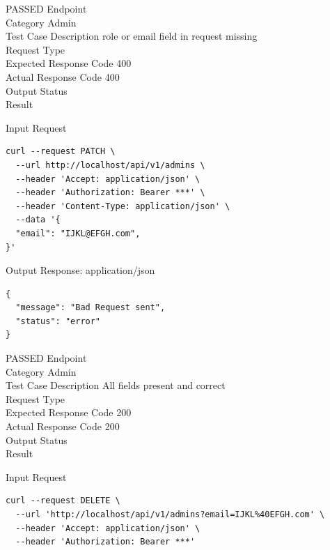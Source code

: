 \begin{testcase}{38}{PASSED}
Endpoint \hfill {}\\
Category \hfill Admin\\
Test Case Description \hfill role or email field in request missing\\

Request Type    \hfill {}\\
Expected Response Code    \hfill 400\\
Actual Response Code    \hfill 400\\

Output Status \hfill {}\\
Result \hfill {}

\begin{ipblock}{Input Request}
\begin{verbatim}
curl --request PATCH \
  --url http://localhost/api/v1/admins \
  --header 'Accept: application/json' \
  --header 'Authorization: Bearer ***' \
  --header 'Content-Type: application/json' \
  --data '{
  "email": "IJKL@EFGH.com",
}'
\end{verbatim}
\end{ipblock}

\begin{opblock}{Output Response: application/json}
\begin{verbatim}
{
  "message": "Bad Request sent",
  "status": "error"
}
\end{verbatim}
\end{opblock}
\end{testcase}

\begin{testcase}{39}{PASSED}
Endpoint \hfill {}\\
Category \hfill Admin\\
Test Case Description \hfill All fields present and correct\\

Request Type    \hfill {}\\
Expected Response Code    \hfill 200\\
Actual Response Code    \hfill 200\\

Output Status \hfill {}\\
Result \hfill \tcstatus{PASSED}

\begin{ipblock}{Input Request}
\begin{verbatim}
curl --request DELETE \
  --url 'http://localhost/api/v1/admins?email=IJKL%40EFGH.com' \
  --header 'Accept: application/json' \
  --header 'Authorization: Bearer ***'
\end{verbatim}
\end{ipblock}

\end{testcase}

